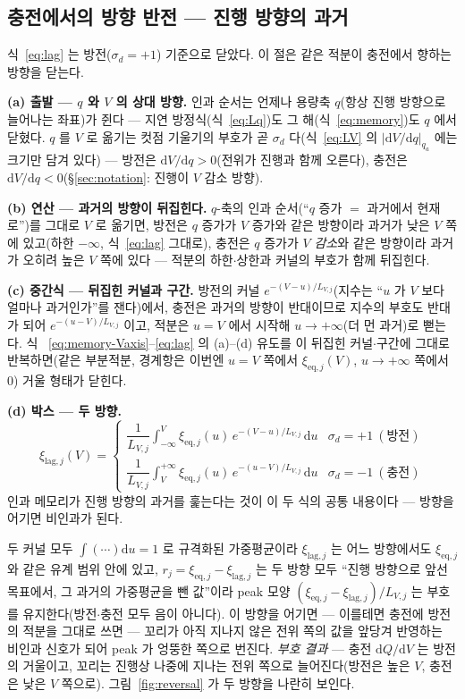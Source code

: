 \documentclass[11pt,a4paper]{article}
\newcommand{\dd}{\mathrm{d}}
\newcommand{\eq}{\mathrm{eq}}
\begin{document}
\subsection{충전에서의 방향 반전 --- 진행 방향의 과거}
식~\eqref{eq:lag} 는 방전($\sigma_d=+1$) 기준으로 닫았다. 이 절은 같은 적분이 충전에서 향하는 방향을
닫는다.

\textbf{(a) 출발 --- $q$ 와 $V$ 의 상대 방향.} 인과 순서는 언제나 용량축 $q$(항상 진행 방향으로
늘어나는 좌표)가 쥔다 --- 지연 방정식(식~\eqref{eq:Lq})도 그 해(식~\eqref{eq:memory})도 $q$ 에서
닫혔다. $q$ 를 $V$ 로 옮기는 컷점 기울기의 부호가 곧 $\sigma_d$ 다(식~\eqref{eq:LV} 의
$|\dd V/\dd q|_{q_a}$ 에는 크기만 담겨 있다) --- 방전은 $\dd V/\dd q>0$(전위가 진행과 함께 오른다),
충전은 $\dd V/\dd q<0$(\S\ref{sec:notation}: 진행이 $V$ 감소 방향).

\textbf{(b) 연산 --- 과거의 방향이 뒤집힌다.} $q$-축의 인과 순서(``$q$ 증가 $=$ 과거에서 현재로'')를
그대로 $V$ 로 옮기면, 방전은 $q$ 증가가 $V$ 증가와 같은 방향이라 과거가 낮은 $V$ 쪽에 있고(하한
$-\infty$, 식~\eqref{eq:lag} 그대로), 충전은 $q$ 증가가 $V$ \emph{감소}와 같은 방향이라 과거가 오히려
높은 $V$ 쪽에 있다 --- 적분의 하한$\cdot$상한과 커널의 부호가 함께 뒤집힌다.

\textbf{(c) 중간식 --- 뒤집힌 커널과 구간.} 방전의 커널 $e^{-(V-u)/L_{V,j}}$(지수는 ``$u$ 가 $V$ 보다
얼마나 과거인가''를 잰다)에서, 충전은 과거의 방향이 반대이므로 지수의 부호도 반대가 되어
$e^{-(u-V)/L_{V,j}}$ 이고, 적분은 $u=V$ 에서 시작해 $u\to+\infty$(더 먼 과거)로 뻗는다. 식
~\eqref{eq:memory-Vaxis}--\eqref{eq:lag} 의 (a)--(d) 유도를 이 뒤집힌 커널$\cdot$구간에 그대로
반복하면(같은 부분적분, 경계항은 이번엔 $u=V$ 쪽에서 $\xi_{\eq,j}(V)$, $u\to+\infty$ 쪽에서 $0$)
거울 형태가 닫힌다.

\textbf{(d) 박스 --- 두 방향.}
\begin{equation}
\boxed{\;
\xi_{\mathrm{lag},j}(V)=
\begin{cases}
\dfrac{1}{L_{V,j}}\displaystyle\int_{-\infty}^{V} \xi_{\eq,j}(u)\,e^{-(V-u)/L_{V,j}}\,\dd u
& \sigma_d=+1\ (\text{방전})\\[12pt]
\dfrac{1}{L_{V,j}}\displaystyle\int_{V}^{+\infty} \xi_{\eq,j}(u)\,e^{-(u-V)/L_{V,j}}\,\dd u
& \sigma_d=-1\ (\text{충전})
\end{cases}\;}
\label{eq:reversal}
\end{equation}
인과 메모리가 진행 방향의 과거를 훑는다는 것이 이 두 식의 공통 내용이다 --- 방향을 어기면 비인과가
된다.

두 커널 모두 $\int(\cdots)\dd u=1$ 로 규격화된 가중평균이라 $\xi_{\mathrm{lag},j}$ 는 어느 방향에서도
$\xi_{\eq,j}$ 와 같은 유계 범위 안에 있고, $r_j=\xi_{\eq,j}-\xi_{\mathrm{lag},j}$ 는 두 방향 모두
``진행 방향으로 앞선 목표에서, 그 과거의 가중평균을 뺀 값''이라 peak 모양
$(\xi_{\eq,j}-\xi_{\mathrm{lag},j})/L_{V,j}$ 는 부호를 유지한다(방전$\cdot$충전 모두 음이 아니다).
이 방향을 어기면 --- 이를테면 충전에 방전의 적분을 그대로 쓰면 --- 꼬리가 아직 지나지 않은 전위
쪽의 값을 앞당겨 반영하는 비인과 신호가 되어 peak 가 엉뚱한 쪽으로 번진다. \emph{부호 결과} ---
충전 $\dd Q/\dd V$ 는 방전의 거울이고, 꼬리는 진행상 나중에 지나는 전위 쪽으로 늘어진다(방전은 높은
$V$, 충전은 낮은 $V$ 쪽으로). 그림~\ref{fig:reversal} 가 두 방향을 나란히 보인다.
\end{document}
